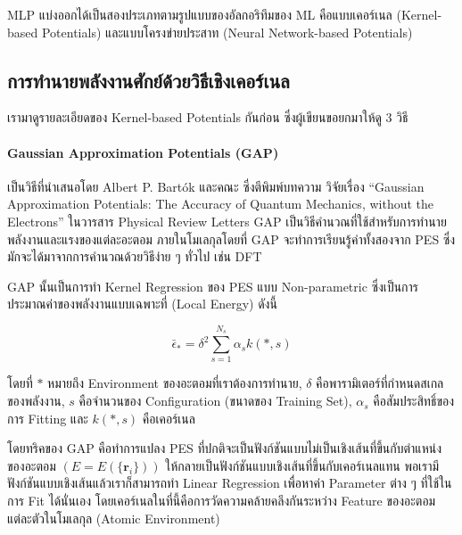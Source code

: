 MLP แบ่งออกได้เป็นสองประเภทตามรูปแบบของอัลกอริทึมของ ML คือแบบเคอร์เนล (Kernel-based Potentials) และแบบโครงข่ายประสาท 
(Neural Network-based Potentials)

\subsection{การทำนายพลังงานศักย์ด้วยวิธีเชิงเคอร์เนล}
\label{ssec:pred_pot_ener_kernel}

เรามาดูรายละเอียดของ Kernel-based Potentials กันก่อน ซึ่งผู้เขียนขอยกมาให้ดู 3 วิธี

\paragraph{Gaussian Approximation Potentials (GAP)} เป็นวิธีที่นำเสนอโดย Albert P. Bart\'{o}k และคณะ ซึ่งตีพิมพ์บทความ%
วิจัยเรื่อง \enquote{Gaussian Approximation Potentials: The Accuracy of Quantum Mechanics, without the Electrons} 
ในวารสาร Physical Review Letters\autocite{bartok2010} GAP เป็นวิธีคำนวณที่ใช้สำหรับการทำนายพลังงานและแรงของแต่ละอะตอม%
ภายในโมเลกุลโดยที่ GAP จะทำการเรียนรู้ค่าทั้งสองจาก PES ซึ่งมักจะได้มาจากการคำนวณด้วยวิธีง่าย ๆ ทั่วไป เช่น DFT 

GAP นั้นเป็นการทำ Kernel Regression ของ PES แบบ Non-parametric ซึ่งเป็นการประมาณค่าของพลังงานแบบเฉพาะที่ (Local Energy)
ดังนี้

\begin{equation}\label{eq:gap}
    \bar{\epsilon}_{\ast} = \delta^{2} \sum\limits_{s = 1}^{N_s} \alpha_{s} k(\ast,s)
\end{equation}

\noindent โดยที่ $\ast$ หมายถึง Environment ของอะตอมที่เราต้องการทำนาย, $\delta$ คือพารามิเตอร์ที่กำหนดสเกลของพลังงาน, 
$s$ คือจำนวนของ Configuration (ขนาดของ Training Set), $\alpha_{s}$ คือสัมประสิทธิ์ของการ Fitting และ $k(\ast,s)$ 
คือเคอร์เนล

โดยทริคของ GAP คือทำการแปลง PES ที่ปกติจะเป็นฟังก์ชันแบบไม่เป็นเชิงเส้นที่ขึ้นกับตำแหน่งของอะตอม $(E = E(\{ \bm{r}_i \}))$ 
ให้กลายเป็นฟังก์ชันแบบเชิงเส้นที่ขึ้นกับเคอร์เนลแทน พอเรามีฟังก์ชันแบบเชิงเส้นแล้วเราก็สามารถทำ Linear Regression เพื่อหาค่า Parameter 
ต่าง ๆ ที่ใช้ในการ Fit ได้นั่นเอง โดยเคอร์เนลในที่นี้คือการวัดความคล้ายคลึงกันระหว่าง Feature ของอะตอมแต่ละตัวในโมเลกุล (Atomic 
Environment)

